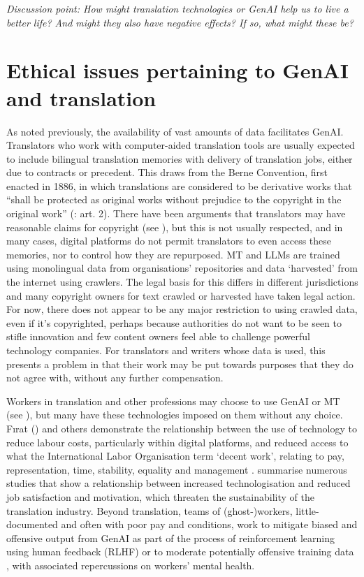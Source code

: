 \documentclass[output=paper]{langscibook}
\begin{document}
\textit{Discussion point: How might translation technologies or GenAI help us to live a better life? And might they also have negative effects? If so, what might these be?}

\section{Ethical issues pertaining to GenAI and translation}\label{sec:6:3}

As noted previously, the availability of vast amounts of data facilitates GenAI. Translators who work with computer-aided translation tools are usually expected to include bilingual translation memories with delivery of translation jobs, either due to contracts or precedent. This draws from the Berne Convention, first enacted in 1886, in which translations are considered to be derivative works that “shall be protected as original works without prejudice to the copyright in the original work” (\citealt{WIPO1971}: art. 2). There have been arguments that translators may have reasonable claims for copyright (see \citealt{moorkenslewis2020}), but this is not usually respected, and in many cases, digital platforms do not permit translators to even access these memories, nor to control how they are repurposed. MT and LLMs are trained using monolingual data from organisations’ repositories and data ‘harvested’ from the internet using crawlers. The legal basis for this differs in different jurisdictions and many copyright owners for text crawled or harvested have taken legal action. For now, there does not appear to be any major restriction to using crawled data, even if it’s copyrighted, perhaps because authorities do not want to be seen to stifle innovation and few content owners feel able to challenge powerful technology companies. For translators and writers whose data is used, this presents a problem in that their work may be put towards purposes that they do not agree with, without any further compensation.

Workers in translation and other professions may choose to use GenAI or MT (see \citealt{rivas_ginel_year_2024}), but many have these technologies imposed on them without any choice. Fırat (\citeyear{Firat2024}) and others demonstrate the relationship between the use of technology to reduce labour costs, particularly within digital platforms, and reduced access to what the International Labor Organisation term ‘decent work’, relating to pay, representation, time, stability, equality and management \citep{ferrero_decent_2015}. \citet{ruokonensvahn2024} summarise numerous studies that show a relationship between increased technologisation and reduced job satisfaction and motivation, which threaten the sustainability of the translation industry. Beyond translation, teams of (ghost-)workers, little-documented and often with poor pay and conditions, work to mitigate biased and offensive output from GenAI as part of the process of reinforcement learning using human feedback (RLHF) or to moderate potentially offensive training data \citep{rowe_its_2023}, with associated repercussions on workers’ mental health.
\end{document}
